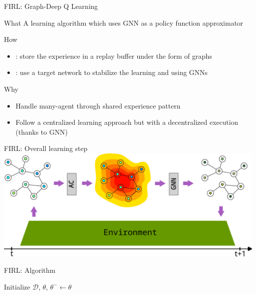 \documentclass[presentation, 9pt,169]{beamer}\mode<presentation>{\usetheme{AMSBolognaFC}}
\begin{document}
\begin{frame}{FIRL: Graph-Deep Q Learning}
  \begin{block}{What}
    A learning algorithm which uses GNN as a policy function approximator
  \end{block}
  \begin{block}{How}
    \begin{itemize}
      \item {}: store the experience in a replay buffer under the form of graphs
      \item {}: use a target network to stabilize the learning and using GNNs
    \end{itemize}
  \end{block}
  \begin{alertblock}{Why}
    \begin{itemize}
      \item Handle many-agent through shared experience pattern 
      \item Follow a centralized learning approach but with a decentralized execution (thanks to GNN)
    \end{itemize}
  \end{alertblock}
\end{frame}
\begin{frame}{FIRL: Overall learning step}
\includegraphics[width=\textwidth]{img/architecture.pdf}
\end{frame}
\begin{frame}{FIRL: Algorithm}
  \begin{algorithm}[H]
    Initialize $\mathcal{D}$, $\theta$, $\theta^- \leftarrow \theta$\;
    \end{algorithm}
\end{frame}
\end{document}
